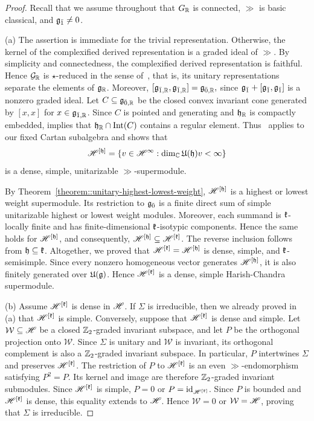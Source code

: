 \begin{proof}
Recall that we assume throughout that $G_{{\mathbb R}}$ is connected, $\gg$ is basic classical, and ${\mathfrak{g}_{\bar{1}}}\neq0$. 

(a) The assertion is immediate for the trivial representation. Otherwise, the kernel of the complexified derived representation is a graded ideal of $\gg$. 
By simplicity and connectedness, the complexified derived representation is faithful. Hence ${\mathcal{G}}_{{\mathbb R}}$ is $\star$-reduced in the sense of~\cite{neeb2011lie}, that is, its unitary representations separate the elements of ${\mathfrak{g}}_{{\mathbb R}}$. Moreover,
$
[{\mathfrak{g}}_{\bar1,{\mathbb R}},{\mathfrak{g}}_{\bar1,{\mathbb R}}]={\mathfrak{g}}_{\bar0,{\mathbb R}},
$
since ${\mathfrak{g}_{\bar{1}}}+[{\mathfrak{g}_{\bar{1}}},{\mathfrak{g}_{\bar{1}}}]$ is a nonzero graded ideal. 
Let $C\subseteq{\mathfrak{g}}_{\bar0,{\mathbb R}}$ be the closed convex invariant cone generated by $[x,x]$ for $x\in{\mathfrak{g}}_{\bar1,{\mathbb R}}$. Since $C$ is pointed and generating and ${\mathfrak h}_{{\mathbb R}}$ is compactly embedded, \cite[Lemma~5.1.3]{neeb2011lie} implies that ${\mathfrak h}_{{\mathbb R}}\cap\operatorname{Int}(C)$ contains a regular element. Thus~\cite[Theorem~7.3.2]{neeb2011lie} applies to our fixed Cartan subalgebra and shows that
\[
{\mathscr{H}}^{[{\mathfrak h}]}
=
\{v\in{\mathscr{H}}^\infty:
\dim_{{\mathbb C}}{\mathfrak U}({\mathfrak h})v<\infty\}
\]
is a dense, simple, unitarizable $\gg$-supermodule.

By Theorem~\ref{theorem::unitary-highest-lowest-weight}, ${\mathscr{H}}^{[{\mathfrak h}]}$ is a highest or lowest weight supermodule. Its restriction to ${\mathfrak{g}_{\bar{0}}}$ is a finite direct sum of simple unitarizable highest or lowest weight modules. Moreover, each summand is ${\mathfrak k}$-locally finite and has finite-dimensional ${\mathfrak k}$-isotypic components. Hence the same holds for ${\mathscr{H}}^{[{\mathfrak h}]}$, and consequently, ${\mathscr{H}}^{[{\mathfrak h}]} \subseteq{\mathscr{H}}^{[{\mathfrak k}]}$. The reverse inclusion follows from ${\mathfrak h}\subseteq{\mathfrak k}$. Altogether, we proved that
$
{\mathscr{H}}^{[{\mathfrak k}]}={\mathscr{H}}^{[{\mathfrak h}]}
$
is dense, simple, and ${\mathfrak k}$-semisimple. Since every nonzero homogeneous vector generates ${\mathscr{H}}^{[{\mathfrak h}]}$, it is also finitely generated over ${\mathfrak U}({\mathfrak{g}})$. Hence ${\mathscr{H}}^{[{\mathfrak k}]}$ is a dense, simple Harish-Chandra supermodule.

(b) Assume ${\mathscr{H}}^{[{\mathfrak k}]}$ is dense in ${\mathscr{H}}$. If $\Sigma$ is irreducible, then we already proved in (a) that ${\mathscr{H}}^{[{\mathfrak k}]}$ is simple. Conversely, suppose that ${\mathscr{H}}^{[{\mathfrak k}]}$ is dense and simple. Let $\mathcal{W}\subseteq{\mathscr{H}}$ be a closed ${\mathbb Z}_2$-graded invariant subspace, and let $P$ be the orthogonal projection onto $\mathcal{W}$. Since $\Sigma$ is unitary and $\mathcal{W}$ is invariant, its orthogonal complement is also a ${\mathbb Z}_2$-graded invariant subspace. In particular, $P$ intertwines $\Sigma$ and preserves ${\mathscr{H}}^{[{\mathfrak k}]}$. The restriction of $P$ to ${\mathscr{H}}^{[{\mathfrak k}]}$ is an even $\gg$-endomorphism satisfying $P^2=P$. Its kernel and image are therefore ${\mathbb Z}_2$-graded invariant submodules. Since ${\mathscr{H}}^{[{\mathfrak k}]}$ is simple, $P=0$ or $P=\operatorname{id}_{{\mathscr{H}}^{[{\mathfrak k}]}}$. Since $P$ is bounded and ${\mathscr{H}}^{[{\mathfrak k}]}$ is dense, this equality extends to ${\mathscr{H}}$. Hence $\mathcal{W}=0$ or $\mathcal{W}={\mathscr{H}}$, proving that $\Sigma$ is irreducible.


\end{proof}
